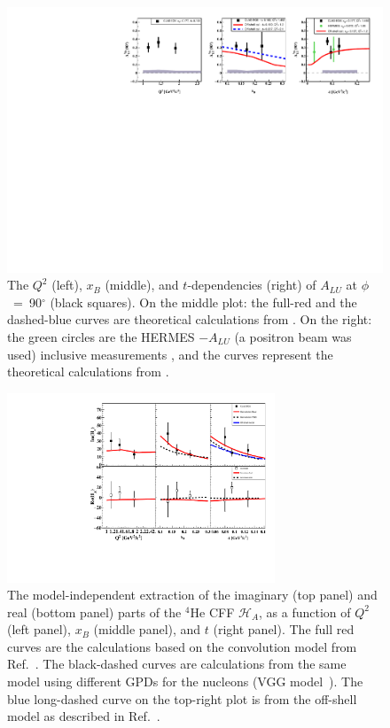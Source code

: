 \documentclass[twocolumn,nofootinbib,showpacs,prl,superscriptaddress,secnumarabic,amssymb,nobibnotes,aps,floatfix]{revtex4}
\begin{document}
\begin{figure}[tb]
\includegraphics[width=17cm]{figs/coherent-ALU_90_2.pdf}
\caption{The $Q^{2}$ (left), $x_{B}$ (middle), and $t$-dependencies (right) of
   $A_{LU}$ at $\phi$~=~90$^{\circ}$ (black squares). On the 
   middle plot: the full-red and the dashed-blue curves are theoretical 
   calculations from \cite{simonetta_2}. On the right: the green circles are 
   the HERMES $-A_{LU}$ (a positron beam was used) inclusive measurements 
   \cite{Airapetian}, and the curves represent the theoretical calculations 
   from \cite{simonetta_2}.}
\label{fig:alu90}
\end{figure}


\begin{figure}[tb]
\includegraphics[width=8cm]{figs/Coherent_CFF.pdf}
\caption{The model-independent extraction of the imaginary (top panel) and
real (bottom panel) parts of the $^4$He CFF $\mathcal{H}_A$, as a function of
$Q^{2}$ (left panel), $x_B$ (middle panel), and $t$ (right panel). The full red 
curves are the calculations based on the convolution model from Ref.~\cite{Vadim_priv}.
The black-dashed curves are calculations from the same 
model using different GPDs for the nucleons (VGG model~\cite{Guidal_priv}). The 
blue long-dashed curve on the top-right plot is from
the off-shell model as described in Ref.~\cite{GonzalezHernandez:2012jv}.}
\label{fig:CFF_HA}
\end{figure}
\end{document}
